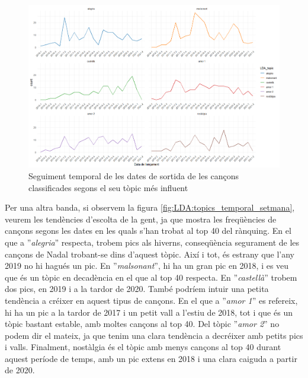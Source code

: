 \begin{figure}[H]
    \centering
    \includegraphics[width=0.98\linewidth]{Images/8_Textual/LDA/topics_temporal_sortida.png}
    \caption{Seguiment temporal de les dates de sortida de les cançons classificades segons el seu tòpic més influent}
    \label{fig:LDA:topics_temporal_sortida}
\end{figure}

Per una altra banda, si observem la figura \ref{fig:LDA:topics_temporal_setmana}, veurem les tendències d'escolta de la gent, ja que mostra les freqüències de cançons segons les dates en les quals s'han trobat al top 40 del rànquing. En el que a ''\textit{alegria}'' respecta, trobem pics als hiverns, conseqüència segurament de les cançons de Nadal trobant-se dins d'aquest tòpic. Així i tot, és estrany que l'any 2019 no hi hagués un pic. En ''\textit{malsonant}'', hi ha un gran pic en 2018, i es veu que és un tòpic en decadència en el que al top 40 respecta. En ''\textit{castellà}'' trobem dos pics, en 2019 i a la tardor de 2020. També podríem intuir una petita tendència a créixer en aquest tipus de cançons. En el que a ''\textit{amor 1}'' es refereix, hi ha un pic a la tardor de 2017 i un petit vall a l'estiu de 2018, tot i que és un tòpic bastant estable, amb moltes cançons al top 40. Del tòpic ''\textit{amor 2}'' no podem dir el mateix, ja que tenim una clara tendència a decréixer amb petits pics i valls. Finalment, nostàlgia és el tòpic amb menys cançons al top 40 durant aquest període de temps, amb un pic extens en 2018 i una clara caiguda a partir de 2020.

